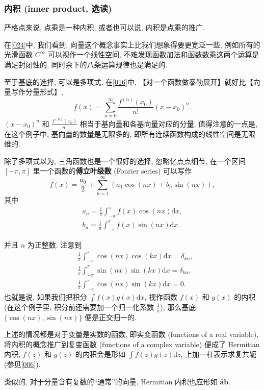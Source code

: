 \subsubsection{内积 (inner product, 选读)}

严格点来说, 点乘是一种内积, 或者也可以说, 内积是点乘的推广.

在\ref{024}中, 我们看到, 向量这个概念事实上比我们想象得要更宽泛一些,
例如所有的光滑函数 $C^\infty$ 可以视作一个线性空间,
不难发现函数加法和函数数乘这两个运算是满足封闭性的,
同时余下的八条运算规律也是满足的.

至于基底的选择, 可以是多项式, 在\ref{016}中,
【对一个函数做泰勒展开】就好比【向量写作分量形式】, \[
f(x)=\sum_{n=0}^\infty\frac{f^{(n)}(x_0)}{n!}(x-x_0)^n.
\] $(x-x_0)^n$ 和 $\frac{f^{(n)}(x_0)}{n!} $
相当于基向量和各基向量对应的分量, 值得注意的一点是, 在这个例子中,
基向量的数量是无限多的, 即所有连续函数构成的线性空间是无限维的.

除了多项式以为, 三角函数也是一个很好的选择, 忽略亿点点细节, 在一个区间
$[-\pi,\pi]$ 里一个函数的\textbf{傅立叶级数} (Fourier series) 可以写作
\[
f(x)=\frac{a_0}{2}+\sum_{n=1}^\infty\left(a_1\cos(nx)+b_n\sin(nx)\right),
\] 其中 \[
\begin{aligned}
a_n=\frac{1}{\pi}\int_{-\pi}^\pi f(x)\cos(nx)\mathrm{d}x,\\
b_n=\frac{1}{\pi}\int_{-\pi}^\pi f(x)\sin(nx)\mathrm{d}x.
\end{aligned}
\]

并且 $n$ 为正整数. 注意到 \[
\begin{aligned}
&\frac{1}{\pi}\int_{-\pi}^{\pi}\cos(nx)\cos(kx)\mathrm{d}x=\delta_{kn},\\
&\frac{1}{\pi}\int_{-\pi}^{\pi}\sin(nx)\sin(kx)\mathrm{d}x=\delta_{kn},\\
&\frac{1}{\pi}\int _{-\pi}^{\pi}\cos(nx)\sin(kx)\mathrm{d}x=0.
\end{aligned}
\] 也就是说, 如果我们把积分 $\int f(x)g(x)\mathrm{d}x$, 视作函数
$f(x)$ 和 $g(x)$ 的内积 (在这个例子里, 积分前还需要加一个归一化系数
$\frac{1}{\pi}$), 那么基底 $\{\cos(nx),\sin(nx)\}$ 便是正交归一的.

\begin{newquote}
上述的情况都是对于变量是实数的函数, 即实变函数 (functions of a real
variable), 将内积的概念推广到复变函数 (functions of a complex variable)
便成了 Hermitian 内积, $f(z)$ 和 $g(z)$ 的内积会是形如
$\int\bar{f}(z)g(z)\mathrm{d}z$, 上加一杠表示求复共轭 (参见\ref{006}).

类似的, 对于分量含有复数的``通常''的向量, Hermitian 内积也应形如
$\bar{\boldsymbol{a}}\boldsymbol{b}$.
\end{newquote}

